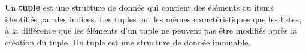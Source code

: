 		\begin{definition}{}
		Un \textbf{tuple} est une structure de donnée qui contient des éléments ou items identifiés par des indices.	
		Les tuples ont les mêmes caractéristiques que les listes, à la différence que les éléments d'un tuple ne peuvent pas être modifiés après la création du tuple. Un tuple est une structure de donnée immuable.

			
		\end{definition}
